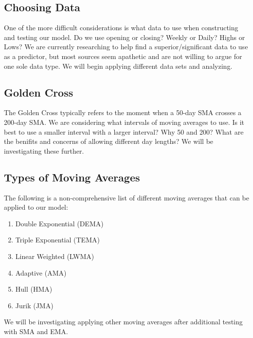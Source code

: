 \documentclass[11pt]{article}
\begin{document}
\subsection*{Choosing Data}
One of the more difficult considerations is what data to use when constructing and testing our model. Do we use opening or closing? Weekly or Daily? Highs or Lows? We are currently researching to help find a superior/significant data to use as a predictor, but most sources seem apathetic and are not willing to argue for one sole data type. We will begin applying different data sets and analyzing.

\subsection*{Golden Cross}
The Golden Cross typically refers to the moment when a 50-day SMA crosses a 200-day SMA. We are considering what intervals of moving averages to use. Is it best to use a smaller interval with a larger interval? Why 50 and 200? What are the benifits and concerns of allowing different day lengths? We will be investigating these further.

\subsection*{Types of Moving Averages}
The following is a non-comprehensive list of different moving averages that can be applied to our model:
\begin{enumerate}
	\item Double Exponential (DEMA)
	\item Triple Exponential (TEMA)
	\item Linear Weighted (LWMA)
	\item Adaptive (AMA)
	\item Hull (HMA)
	\item Jurik (JMA)
\end{enumerate}
We will be investigating applying other moving averages after additional testing with SMA and EMA.

\end{document}
